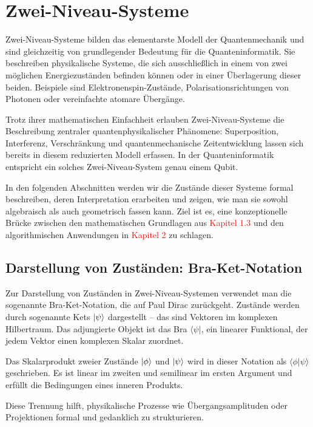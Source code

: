 \section{Zwei-Niveau-Systeme}

Zwei-Niveau-Systeme bilden das elementarste Modell der Quantenmechanik und sind gleichzeitig von grundlegender Bedeutung für die Quanteninformatik. Sie beschreiben physikalische Systeme, die sich ausschließlich in einem von zwei möglichen Energiezuständen befinden können oder in einer Überlagerung dieser beiden. Beispiele sind Elektronenspin-Zustände, Polarisationsrichtungen von Photonen oder vereinfachte atomare Übergänge.

Trotz ihrer mathematischen Einfachheit erlauben Zwei-Niveau-Systeme die Beschreibung zentraler quantenphysikalischer Phänomene: Superposition, Interferenz, Verschränkung und quantenmechanische Zeitentwicklung lassen sich bereits in diesem reduzierten Modell erfassen. In der Quanteninformatik entspricht ein solches Zwei-Niveau-System genau einem Qubit.

In den folgenden Abschnitten werden wir die Zustände dieser Systeme formal beschreiben, deren Interpretation erarbeiten und zeigen, wie man sie sowohl algebraisch als auch geometrisch fassen kann. Ziel ist es, eine konzeptionelle Brücke zwischen den mathematischen Grundlagen aus \textcolor{red}{Kapitel 1.3} und den algorithmischen Anwendungen in \textcolor{red}{Kapitel 2} zu schlagen.

\subsection{Darstellung von Zuständen: Bra-Ket-Notation}

Zur Darstellung von Zuständen in Zwei-Niveau-Systemen verwendet man die sogenannte Bra-Ket-Notation, die auf Paul Dirac zurückgeht. Zustände werden durch sogenannte Kets $\ket{\psi}$ dargestellt – das sind Vektoren im komplexen Hilbertraum. Das adjungierte Objekt ist das Bra $\langle \psi|$, ein linearer Funktional, der jedem Vektor einen komplexen Skalar zuordnet.

Das Skalarprodukt zweier Zustände $\ket{\phi}$ und $\ket{\psi}$ wird in dieser Notation als $\langle \phi | \psi \rangle$ geschrieben. Es ist linear im zweiten und semilinear im ersten Argument und erfüllt die Bedingungen eines inneren Produkts.



Diese Trennung hilft, physikalische Prozesse wie Übergangsamplituden oder Projektionen formal und gedanklich zu strukturieren.

